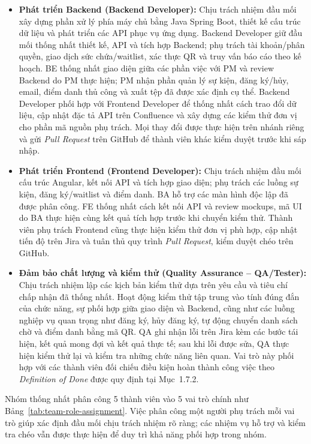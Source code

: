 \begin{itemize}
    \item \textbf{Phát triển Backend (Backend Developer):} Chịu trách nhiệm đầu mối xây dựng phần xử lý phía máy chủ bằng Java Spring Boot, thiết kế cấu trúc dữ liệu và phát triển các API phục vụ ứng dụng. Backend Developer giữ đầu mối thống nhất thiết kế, API và tích hợp Backend; phụ trách tài khoản/phân quyền, giao dịch sức chứa/waitlist, xác thực QR và truy vấn báo cáo theo kế hoạch. BE thống nhất giao diện giữa các phần việc với PM và review Backend do PM thực hiện; PM nhận phần quản lý sự kiện, đăng ký/hủy, email, điểm danh thủ công và xuất tệp đã được xác định cụ thể. Backend Developer phối hợp với Frontend Developer để thống nhất cách trao đổi dữ liệu, cập nhật đặc tả API trên Confluence và xây dựng các kiểm thử đơn vị cho phần mã nguồn phụ trách. Mọi thay đổi được thực hiện trên nhánh riêng và gửi \textit{Pull Request} trên GitHub để thành viên khác kiểm duyệt trước khi sáp nhập.

    \item \textbf{Phát triển Frontend (Frontend Developer):} Chịu trách nhiệm đầu mối cấu trúc Angular, kết nối API và tích hợp giao diện; phụ trách các luồng sự kiện, đăng ký/waitlist và điểm danh. BA hỗ trợ các màn hình độc lập đã được phân công. FE thống nhất cách kết nối API và review mockups, mã UI do BA thực hiện cùng kết quả tích hợp trước khi chuyển kiểm thử. Thành viên phụ trách Frontend cũng thực hiện kiểm thử đơn vị phù hợp, cập nhật tiến độ trên Jira và tuân thủ quy trình \textit{Pull Request}, kiểm duyệt chéo trên GitHub.

    \item \textbf{Đảm bảo chất lượng và kiểm thử (Quality Assurance -- QA/Tester):} Chịu trách nhiệm lập các kịch bản kiểm thử dựa trên yêu cầu và tiêu chí chấp nhận đã thống nhất. Hoạt động kiểm thử tập trung vào tính đúng đắn của chức năng, sự phối hợp giữa giao diện và Backend, cũng như các luồng nghiệp vụ quan trọng như đăng ký, hủy đăng ký, tự động chuyển danh sách chờ và điểm danh bằng mã QR. QA ghi nhận lỗi trên Jira kèm các bước tái hiện, kết quả mong đợi và kết quả thực tế; sau khi lỗi được sửa, QA thực hiện kiểm thử lại và kiểm tra những chức năng liên quan. Vai trò này phối hợp với các thành viên đối chiếu điều kiện hoàn thành công việc theo \textit{Definition of Done} được quy định tại Mục~1.7.2.
\end{itemize}


Nhóm thống nhất phân công 5 thành viên vào 5 vai trò chính như Bảng~\ref{tab:team-role-assignment}. Việc phân công một người phụ trách mỗi vai trò giúp xác định đầu mối chịu trách nhiệm rõ ràng; các nhiệm vụ hỗ trợ và kiểm tra chéo vẫn được thực hiện để duy trì khả năng phối hợp trong nhóm.

